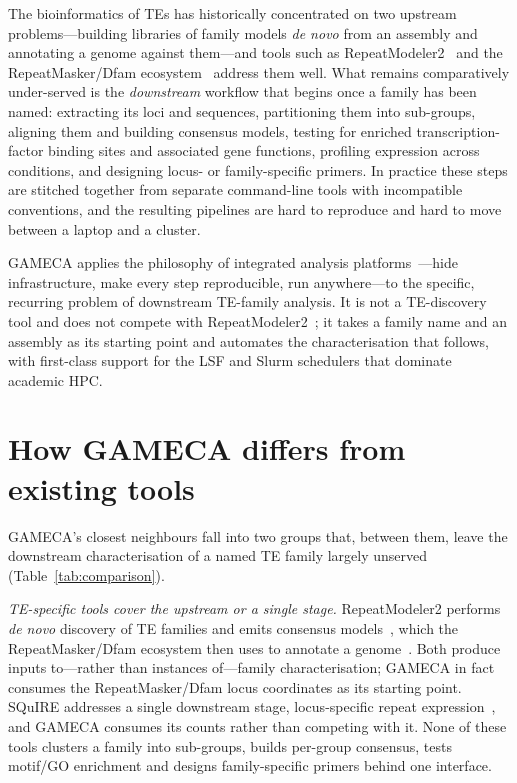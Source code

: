 \documentclass[11pt]{article}
\begin{document}
The bioinformatics of TEs has historically concentrated on two upstream problems---building
libraries of family models \emph{de novo} from an assembly and annotating a genome against
them---and tools such as RepeatModeler2~\citep{flynn2020} and the RepeatMasker/Dfam
ecosystem~\citep{hubley2016} address them well. What remains comparatively under-served is the
\emph{downstream} workflow that begins once a family has been named: extracting its loci and
sequences, partitioning them into sub-groups, aligning them and building consensus models,
testing for enriched transcription-factor binding sites and associated gene functions,
profiling expression across conditions, and designing locus- or family-specific primers. In
practice these steps are stitched together from separate command-line tools with incompatible
conventions, and the resulting pipelines are hard to reproduce and hard to move between a
laptop and a cluster.

GAMECA applies the philosophy of integrated analysis
platforms~\citep{galaxy2022,genepattern2006,ewels2020,ditommaso2017}---hide infrastructure,
make every step reproducible, run anywhere---to the specific, recurring problem of downstream
TE-family analysis. It is not a TE-discovery tool and does not compete with
RepeatModeler2~\citep{flynn2020}; it takes a family name and an assembly as its starting point
and automates the characterisation that follows, with first-class support for the LSF and
Slurm schedulers that dominate academic HPC.

\section{How GAMECA differs from existing tools}
\label{sec:comparison}

GAMECA's closest neighbours fall into two groups that, between them, leave the downstream
characterisation of a named TE family largely unserved (Table~\ref{tab:comparison}).

\emph{TE-specific tools cover the upstream or a single stage.} RepeatModeler2 performs
\emph{de novo} discovery of TE families and emits consensus models~\citep{flynn2020}, which
the RepeatMasker/Dfam ecosystem then uses to annotate a genome~\citep{hubley2016}. Both
produce inputs to---rather than instances of---family characterisation; GAMECA in fact
consumes the RepeatMasker/Dfam locus coordinates as its starting point. SQuIRE addresses a
single downstream stage, locus-specific repeat expression~\citep{yang2019squire}, and
GAMECA consumes its counts rather than competing with it. None of these tools clusters a
family into sub-groups, builds per-group consensus, tests motif/GO enrichment and designs
family-specific primers behind one interface.
\end{document}
